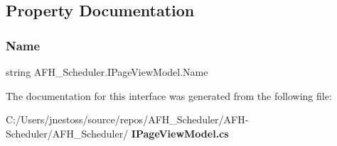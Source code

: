 \subsection{Property Documentation}
\mbox{\label{interface_a_f_h___scheduler_1_1_i_page_view_model_a1a4df25f977e3890b41f27f9e14fe2a4}} 
\subsubsection{Name}
{\footnotesize\ttfamily string A\+F\+H\+\_\+\+Scheduler.\+I\+Page\+View\+Model.\+Name\hspace{0.3cm}{\ttfamily [get]}}



The documentation for this interface was generated from the following file\+:\begin{DoxyCompactItemize}
\item 
C\+:/\+Users/jnestoss/source/repos/\+A\+F\+H\+\_\+\+Scheduler/\+A\+F\+H-\/\+Scheduler/\+A\+F\+H\+\_\+\+Scheduler/\textbf{ I\+Page\+View\+Model.\+cs}\end{DoxyCompactItemize}
